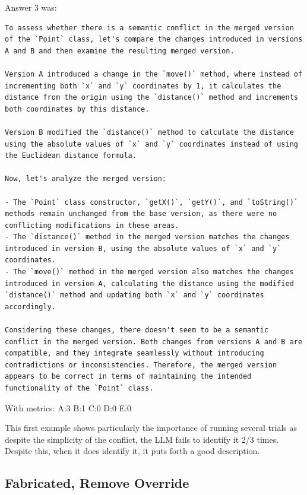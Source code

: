 Answer 3 was:
\begin{lstlisting}
To assess whether there is a semantic conflict in the merged version of the `Point` class, let's compare the changes introduced in versions A and B and then examine the resulting merged version.

Version A introduced a change in the `move()` method, where instead of incrementing both `x` and `y` coordinates by 1, it calculates the distance from the origin using the `distance()` method and increments both coordinates by this distance.

Version B modified the `distance()` method to calculate the distance using the absolute values of `x` and `y` coordinates instead of using the Euclidean distance formula.

Now, let's analyze the merged version:

- The `Point` class constructor, `getX()`, `getY()`, and `toString()` methods remain unchanged from the base version, as there were no conflicting modifications in these areas.
- The `distance()` method in the merged version matches the changes introduced in version B, using the absolute values of `x` and `y` coordinates.
- The `move()` method in the merged version also matches the changes introduced in version A, calculating the distance using the modified `distance()` method and updating both `x` and `y` coordinates accordingly.

Considering these changes, there doesn't seem to be a semantic conflict in the merged version. Both changes from versions A and B are compatible, and they integrate seamlessly without introducing contradictions or inconsistencies. Therefore, the merged version appears to be correct in terms of maintaining the intended functionality of the `Point` class. 
\end{lstlisting}

With metrics:
A:3
B:1
C:0
D:0
E:0

This first example shows particularly the importance of running several trials as despite the simplicity of the conflict, the LLM fails to identify it 2/3 times. Despite this, when it does identify it, it puts forth a good description.

\subsection{Fabricated, Remove Override}

